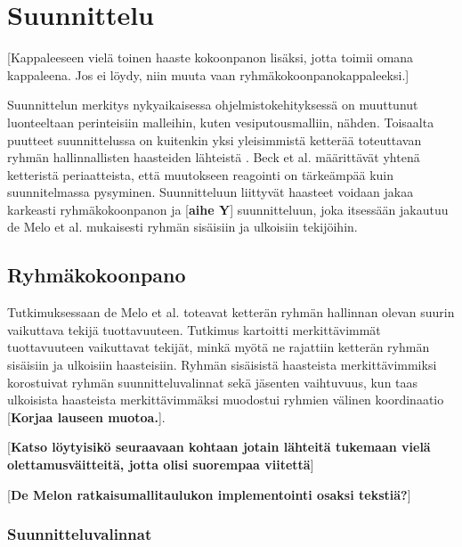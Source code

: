 \chapter{Suunnittelu}

[Kappaleeseen vielä toinen haaste kokoonpanon lisäksi, jotta toimii omana kappaleena. Jos ei löydy, niin muuta vaan ryhmäkokoonpanokappaleeksi.]

Suunnittelun merkitys nykyaikaisessa ohjelmistokehityksessä on muuttunut luonteeltaan perinteisiin malleihin, kuten vesiputousmalliin, nähden. Toisaalta puutteet suunnittelussa on kuitenkin yksi yleisimmistä ketterää toteuttavan ryhmän hallinnallisten haasteiden lähteistä \cite{7872736}. Beck et al. \cite{beck2001agile} määrittävät yhtenä ketteristä periaatteista, että muutokseen reagointi on tärkeämpää kuin suunnitelmassa pysyminen. Suunnitteluun liittyvät haasteet voidaan jakaa karkeasti ryhmäkokoonpanon ja [\textbf{aihe Y}] suunnitteluun, joka itsessään jakautuu de Melo et al. \cite{DEOMELO2013412} mukaisesti ryhmän sisäisiin ja ulkoisiin tekijöihin.

\section{Ryhmäkokoonpano}

Tutkimuksessaan de Melo et al. \cite{DEOMELO2013412} toteavat ketterän ryhmän hallinnan olevan suurin vaikuttava tekijä tuottavuuteen. Tutkimus kartoitti merkittävimmät tuottavuuteen vaikuttavat tekijät, minkä myötä ne rajattiin ketterän ryhmän sisäisiin ja ulkoisiin haasteisiin. Ryhmän sisäisistä haasteista merkittävimmiksi korostuivat ryhmän suunnitteluvalinnat sekä jäsenten vaihtuvuus, kun taas ulkoisista haasteista merkittävimmäksi muodostui ryhmien välinen koordinaatio [\textbf{Korjaa lauseen muotoa.}].

[\textbf{Katso löytyisikö seuraavaan kohtaan jotain lähteitä tukemaan vielä olettamusväitteitä, jotta olisi suorempaa viitettä}]

[\textbf{De Melon ratkaisumallitaulukon implementointi osaksi tekstiä?}]

\subsection{Suunnitteluvalinnat}

